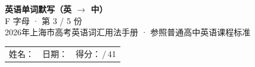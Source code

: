 \documentclass[10pt,a4paper]{article}
\begin{document}
\pagestyle{plain}

\begin{center}
{\LARGE\bfseries 英语单词默写（英 $\to$ 中）}\\[0.22em]
{\large F 字母 · 第 3 / 5 份}\\[0.18em]
{\small 2026年上海市高考英语词汇用法手册 · 参照普通高中英语课程标准}
\end{center}

\vspace{0.25em}
\noindent\begin{tabular}{@{}p{}@{}p{}@{}p{}@{}}
姓名：\underline{\hspace{2.0cm}} & 日期：\underline{\hspace{2.0cm}} & 得分：\underline{\hspace{1.3cm}}\,/\,41 \\
\end{tabular}

\vspace{0.3em}

\vspace{0.08em}
\end{document}
